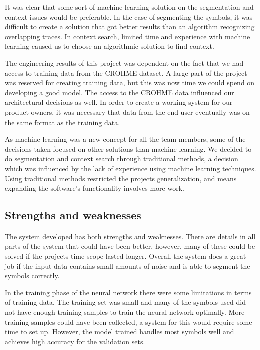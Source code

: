 It was clear that some sort of machine learning solution on the segmentation and context issues would be preferable. In the case of segmenting the symbols, it was difficult to create a solution that got better results than an algorithm recognizing overlapping traces. In context search, limited time and experience with machine learning caused us to choose an algorithmic solution to find context.

The engineering results of this project was dependent on the fact that we had access to training data from the CROHME dataset. A large part of the project was reserved for creating training data, but this was now time we could spend on developing a good model. The access to the CROHME data influenced our architectural decisions as well. In order to create a working system for our product owners, it was necessary that data from the end-user eventually was on the same format as the training data.

As machine learning was a new concept for all the team members, some of the decisions taken focused on other solutions than machine learning. We decided to do segmentation and context search through traditional methods, a decision which was influenced by the lack of experience using machine learning techniques. Using traditional methods restricted the projects generalization, and means expanding the software's functionality involves more work.

\subsection{Strengths and weaknesses}

The system developed has both strengths and weaknesses. There are details in all parts of the system that could have been better, however, many of these could be solved if the projects time scope lasted longer. Overall the system does a great job if the input data contains small amounts of noise and is able to segment the symbols correctly. %

In the training phase of the neural network there were some limitations in terms of training data. The training set was small and many of the symbols used did not have enough training samples to train the neural network optimally. More training samples could have been collected, a system for this would require some time to set up. However, the model trained handles most symbols well and achieves high accuracy for the validation sets.

